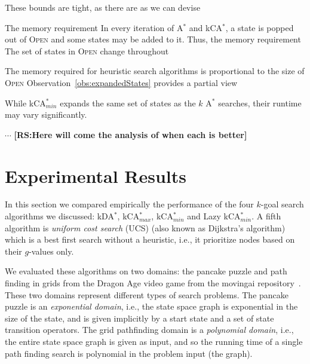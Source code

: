 \documentclass{aicom2e}
\newcommand{\kgs}{$k$-goal search}
\newcommand{\astar}{A$^*$}
\newcommand{\kastar}{kCA$^*$}
\newcommand{\kastarmin}{kCA$^*_{min}$}
\newcommand{\kastarmax}{kCA$^*_{max}$}
\newcommand{\kxastar}{kDA$^*$}
\newcommand{\open}{\textsc{Open}}
\newcommand{\roni}[1]{\textbf{[RS:#1]}}
\begin{document}
These bounds are tight, as there are as we can devise



The memory requirement
In every iteration of \astar{} and \kastar{}, a state is popped out of \open{} and some states may be added to it.
Thus, the memory requirement The set of states in \open{} change throughout

The memory required for heuristic search algorithms is proportional to the size of \open{}
Observation~\ref{obs:expandedStates} provides a partial view










While \kastarmin{} expands the same set of states as the $k$ \astar{} searches,
their runtime may vary significantly.

$\cdots$
\roni{Here will come the analysis of when each is better}






\section{Experimental Results}


In this section we compared empirically the performance of the four \kgs{}
algorithms we discussed: \kxastar{}, \kastarmax{}, \kastarmin{}  and Lazy
\kastarmin{}. A fifth algorithm is {\em uniform cost search} (UCS) (also known
as Dijkstra's algorithm) which is a best first search without a heuristic,
i.e., it prioritize nodes based on their $g$-values only.

We evaluated these algorithms on two domains: the pancake puzzle and path
finding in grids from the Dragon Age video game from the movingai
repository~\cite{sturtevant2012benchmarks}. These two domains represent
different types of search problems. The pancake puzzle is an {\em exponential
domain}, i.e., the state space graph is exponential in the size of the state,
and is given implicitly by a start state and a set of state transition
operators. The grid pathfinding domain is a {\em polynomial domain}, i.e., the
entire state space graph is given as input, and so the running time of a single
path finding search is polynomial in the problem input (the graph).
\end{document}
